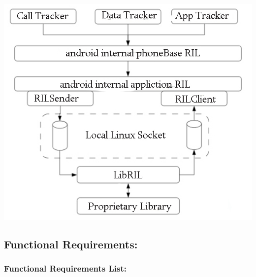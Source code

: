 \documentclass[11pt]{article}
\begin{document}
				\includegraphics[width=0.5\linewidth]{Images/software.jpg}\\[0.5cm]
		
		\subsection{Functional Requirements:}
		
		\subsubsection{Functional Requirements List:}
		
\end{document}
